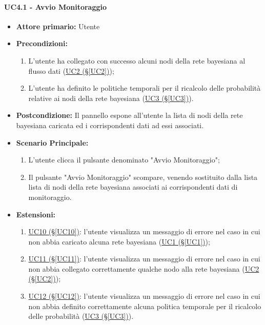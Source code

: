 \paragraph{UC4.1 - Avvio Monitoraggio}\label{UC4.1}
\begin{itemize}
\item \textbf{Attore primario:} Utente
\item \textbf{Precondizioni:}
	\begin{enumerate}
	\item L'utente ha collegato con successo alcuni nodi della rete bayesiana al flusso dati (\hyperref[UC2]{UC2 					(§\ref*{UC2})});
	\item L'utente ha definito le politiche temporali per il ricalcolo delle probabilità relative ai nodi della rete 			bayesiana (\hyperref[UC3]{UC3 (§\ref*{UC3})}).
	\end{enumerate}
\item \textbf{Postcondizione:} Il pannello espone all'utente la lista di nodi della rete bayesiana caricata ed i 			corrispondenti dati ad essi associati.
\item \textbf{Scenario Principale:}
	\begin{enumerate}
	\item L'utente clicca il pulsante denominato "Avvio Monitoraggio";
	\item Il pulsante "Avvio Monitoraggio" scompare, venendo sostituito dalla lista lista di nodi della rete 							bayesiana associati ai corrispondenti dati di monitoraggio.
	\end{enumerate}
\item \textbf{Estensioni:}
	\begin{enumerate}
	\item \hyperref[UC10]{UC10 (§\ref*{UC10})}: l'utente visualizza un messaggio di errore nel caso in cui non abbia 			caricato alcuna rete bayesiana (\hyperref[UC1]{UC1 (§\ref*{UC1})});
	\item \hyperref[UC11]{UC11 (§\ref*{UC11})}: l'utente visualizza un messaggio di errore nel caso in cui non abbia 			collegato correttamente qualche nodo alla rete bayesiana (\hyperref[UC2]{UC2 (§\ref*{UC2})});
	\item \hyperref[UC12]{UC12 (§\ref*{UC12})}: l'utente visualizza un messaggio di errore nel caso in cui non abbia 			definito correttamente alcuna politica temporale per il ricalcolo delle probabilità (\hyperref[UC3]{UC3 							(§\ref*{UC3})}).
	\end{enumerate}
\end{itemize}


